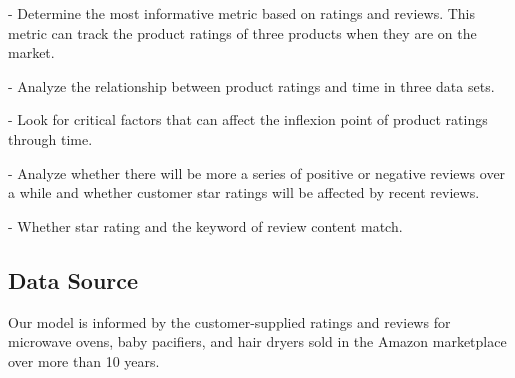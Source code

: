 \documentclass{mcmthesis}
\begin{document}
- Determine the most informative metric based on ratings and reviews. This metric can track the product ratings of three products when they are on the market.

- Analyze the relationship between product ratings and time in three data sets.

- Look for critical factors that can affect the inflexion point of product ratings through time.

- Analyze whether there will be more a series of positive or negative reviews over a while and whether customer star ratings will be affected by recent reviews.

- Whether star rating and the keyword of review content match.
\subsection{Data Source}
Our model is informed by the customer-supplied ratings and reviews for microwave ovens, baby pacifiers, and hair dryers sold in the Amazon marketplace over more than 10 years.
\end{document}
